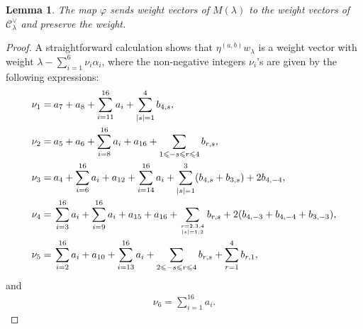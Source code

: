 \documentclass[12pt]{article}
\numberwithin{equation}{section}
\newtheorem{lemma}[theorem]{Lemma}
\theoremstyle{definition}
\theoremstyle{remark}
\begin{document}
\begin{lemma}\label{ch}
	The map $\varphi$ sends weight vectors of $M(\lambda)$ to the weight vectors of $\mathscr{C}_{\lambda}^{\vee}$ and preserve the weight. 
\end{lemma}
\begin{proof}
	A straightforward calculation shows that $\eta^{(a,b)}w_{\lambda}$ is a weight vector with weight $\lambda-\sum_{i=1}^6\nu_i\alpha_i$, where the non‑negative integers $\nu_i$'s are given by the following expressions:
	\begin{align}
		\nu_1=&\:a_7+a_8+\sum_{i=11}^{16}a_i+\sum_{|s|=1}^4b_{4,s}, \label{ch1}        \\
		\nu_2=&\:a_5+a_6+\sum_{i=8}^{16}a_i+a_{16}+\sum_{1\leqslant -s\leqslant r\leqslant 4}b_{r,s} ,          \\
		\nu_3=&\:a_4+\sum_{i=6}^{16}a_{i}+a_{12}+\sum_{i=14}^{16}a_{i}+\sum_{|s|=1}^3(b_{4,s}+b_{3,s})+2b_{4,-4},     \\
		\nu_4=&\:\sum_{i=3}^{16}a_i+\sum_{i=9}^{16}a_i+a_{15}+a_{16}+\sum_{r=2,3,4\atop |s|=1,2}b_{r,s}+2(b_{4,-3}+b_{4,-4}+b_{3,-3}),           \\
		\nu_5=&\:\sum_{i=2}^{16}a_i+a_{10}+\sum_{i=13}^{16}a_{i}+\sum_{2\leqslant -s\leqslant r\leqslant 4}b_{r,s}+\sum_{r=1}^4b_{r,1},                    
	\end{align}
	and
	\begin{align}
		\nu_6=\sum_{i=1}^{16}a_i.  
	\end{align}
	

\end{proof}
\end{document}
